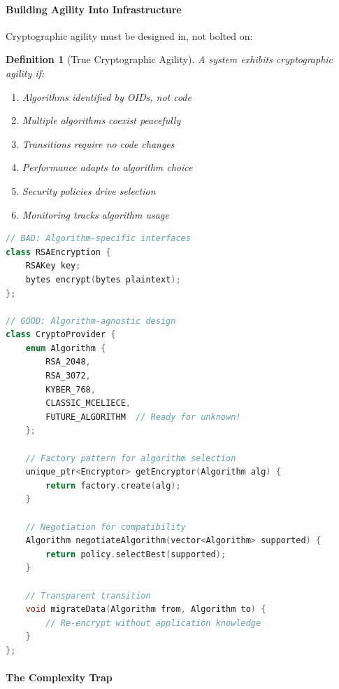 \documentclass[11pt,a4paper]{article}
\newtheorem{definition}{Definition}
\begin{document}
\paragraph{Building Agility Into Infrastructure}

Cryptographic agility must be designed in, not bolted on:

\begin{definition}[True Cryptographic Agility]
A system exhibits cryptographic agility if:
\begin{enumerate}
    \item Algorithms identified by OIDs, not code
    \item Multiple algorithms coexist peacefully
    \item Transitions require no code changes
    \item Performance adapts to algorithm choice
    \item Security policies drive selection
    \item Monitoring tracks algorithm usage
\end{enumerate}
\end{definition}

\begin{lstlisting}[language=C++, caption=Agile Architecture Pattern]
// BAD: Algorithm-specific interfaces
class RSAEncryption {
    RSAKey key;
    bytes encrypt(bytes plaintext);
};

// GOOD: Algorithm-agnostic design
class CryptoProvider {
    enum Algorithm {
        RSA_2048,
        RSA_3072,
        KYBER_768,
        CLASSIC_MCELIECE,
        FUTURE_ALGORITHM  // Ready for unknown!
    };
    
    // Factory pattern for algorithm selection
    unique_ptr<Encryptor> getEncryptor(Algorithm alg) {
        return factory.create(alg);
    }
    
    // Negotiation for compatibility
    Algorithm negotiateAlgorithm(vector<Algorithm> supported) {
        return policy.selectBest(supported);
    }
    
    // Transparent transition
    void migrateData(Algorithm from, Algorithm to) {
        // Re-encrypt without application knowledge
    }
};
\end{lstlisting}

\paragraph{The Complexity Trap}
\end{document}
